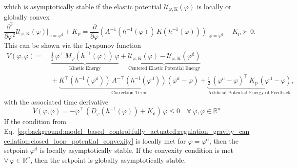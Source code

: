which is asymptotically stable if the elastic potential $\mathcal{U}_{\varphi,\mathrm{K}}(\varphi)$ is locally or globally convex
\begin{equation}\label{eq:background:model_based_control:fully_actuated:regulation_gravity_cancellation:closed_loop_potential_convexity}
    \frac{\partial^2}{\partial \varphi^2} \mathcal{U}_{\varphi,\mathrm{K}}(\varphi) \bigg |_\mathrm{\varphi = \varphi^\mathrm{d}} + K_\mathrm{p} = \frac{\partial}{\partial \varphi} \left (  A^{-1}(h^{-1}(\varphi)) \,  K(h^{-1}(\varphi)) \right ) \bigg |_\mathrm{\varphi = \varphi^\mathrm{d}} + K_\mathrm{p} \succ 0.
\end{equation}
This can be shown via the Lyapunov function~\citep{khalil2002nonlinear, della2020model, della2023model}
\begin{equation}
\begin{split}
    V(\varphi, \dot{\varphi}) =& \: \underbrace{\frac{1}{2} \, \dot{\varphi}^\top \, M_\varphi(h^{-1}(\varphi)) \, \dot{\varphi}}_\text{Kinetic Energy} + \underbrace{\mathcal{U}_{\varphi,\mathrm{K}}(\varphi) - \mathcal{U}_{\varphi,\mathrm{K}}(\varphi^\mathrm{d})}_\text{Centered Elastic Potential Energy}\\
    & \: + \underbrace{K^\top(h^{-1}(\varphi^\mathrm{d})) \, A^{-\top}(h^{-1}(\varphi^\mathrm{d})) \left ( \varphi^\mathrm{d} - \varphi \right )}_\text{Correction Term} + \underbrace{\frac{1}{2} \, (\varphi^\mathrm{d} - \varphi)^\top \, K_\mathrm{p} \, (\varphi^\mathrm{d} - \varphi)}_\text{Artificial Potential Energy of Feedback},
\end{split}
\end{equation}
with the associated time derivative~\citep{della2023model}
\begin{equation}
    \dot{V}(\varphi, \dot{\varphi}) = -\dot{\varphi}^\top \, \left ( D_\varphi(h^{-1}(\varphi)) + K_\mathrm{d} \right ) \, \dot{\varphi} \leq 0 \quad \forall \: \varphi,\dot{\varphi} \in \mathbb{R}^n
\end{equation}
If the condition from Eq.~\ref{eq:background:model_based_control:fully_actuated:regulation_gravity_cancellation:closed_loop_potential_convexity} is locally met for $\varphi = \varphi^\mathrm{d}$, then the setpoint $\varphi^\mathrm{d}$ is locally asymptotically stable. If the convexity condition is met $\forall \: \varphi \in \mathbb{R}^n$, then the setpoint is globally asymptotically stable.

